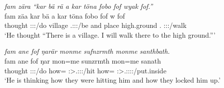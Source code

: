 \begin{exe}
	\ex \emph{fam zära ``kar bä rä a kar töna fobo fof wyak fof.''}\\
	\gll fam zäa kar bä  a kar töna fobo fof w fof\\
	thought \Sg:\Sbj:\Pst:\Pfv/do village \Med{} \Tsg.\F:\Sbj:\Nonpast:\Ipfv/be and place {high.ground} \Dist.{\All} {\Emph} \Fsg:\Sbj:\Nonpast:\Ipfv/walk {\Emph}\\
	\trans `He thought ``There is a village. I will walk there to the high ground.'''\\
	\label{ex654}
\end{exe}
\begin{exe}
	\ex \emph{fam ane fof ŋarär monme sufnzrmth monme santhbath.}\\
	\gll fam ane fof ŋar mon=me sunzrmth mon=me sanath\\
	thought {\Dem} {\Emph} \Stsg:\Sbj:\Nonpast:\Ipfv/do how={\Ins} \Stpl:\Sbj>\Tsg.\Masc:\Obj:\Pst:\Dur/hit how={\Ins} \Stpl:\Sbj>\Tsg.\Masc:\Obj:\Pst:\Dur:\Venit/put.inside\\
	\trans `He is thinking how they were hitting him and how they locked him up.'\\
	\label{ex655}
\end{exe}